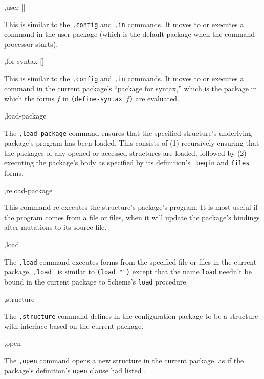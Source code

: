 \begin{list}{}{}{}
\item
\begin{code}
,user $[$$]$
\end{code}
    This is similar to the {\tt ,config} and {\tt ,in} commands.  It
    moves to or executes a command in the user package (which is the
    default package when the \hack{} command processor starts).

\item
\begin{code}
,for-syntax $[$$]$
\end{code}
    This is similar to the {\tt ,config} and {\tt ,in} commands.  It
    moves to or executes a command in the current package's ``package
    for syntax,'' which is the package in which the forms $f$ in
    {\tt (define-syntax  $f$)} are evaluated.

\item
\begin{code}
,load-package 
\end{code}
    The {\tt,load-package} command ensures that the specified structure's
    underlying package's program has been loaded.  This 
    consists of (1) recursively ensuring that the packages of any
    opened or accessed structures are loaded, followed by (2)
    executing the package's body as specified by its definition's {\tt
    begin} and {\tt files} forms.

\item
\begin{code}
,reload-package 
\end{code}
    This command re-executes the structure's package's program.  It
    is most useful if the program comes from a file or files, when
    it will update the package's bindings after mutations to its
    source file.

\item
\begin{code}
,load  \etc
\end{code}
    The {\tt,load} command executes forms from the specified file or
    files in the current package.  {\tt,load } is similar
    to {\tt(load "")}
    except that the name {\tt load} needn't be bound in the current
    package to Scheme's {\tt load} procedure.

\item
\begin{code}
,structure  
\end{code}
    The {\tt,structure} command defines  in the
    configuration package to be a structure with interface
     based on the current package.

\item
\begin{code}
,open 
\end{code}
    The {\tt,open} command opens a new structure in the current
    package, as if the package's definition's {\tt open} clause
    had listed .

\end{list}



